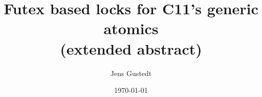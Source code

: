 \documentclass{sig-alternate-05-2015}
\author{Jens Gustedt\\
\affaddr{INRIA and ICube, Universit\'{e} de Strasbourg, France}}
\date{\today}
\title{Futex based locks for C11's generic atomics\\
(extended abstract)}
\let\tableofcontents=\relax
\begin{document}
\maketitle
\tableofcontents


\begin{abstract}

\end{abstract}






\end{document}
